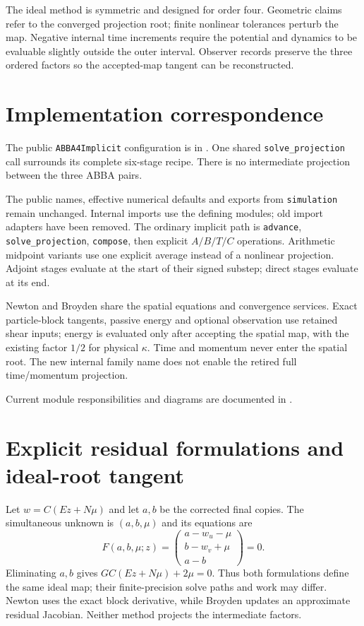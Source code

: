 \documentclass[11pt,a4paper]{article}
\begin{document}
The ideal method is symmetric and designed for order four.  Geometric claims
refer to the converged projection root; finite nonlinear tolerances perturb the
map.  Negative internal time increments require the potential and dynamics to
be evaluable slightly outside the outer interval.  Observer records preserve
the three ordered factors so the accepted-map tangent can be reconstructed.

\section{Implementation correspondence}
The public \texttt{ABBA4Implicit} configuration is in
. One shared
\texttt{solve\_projection} call surrounds its complete six-stage recipe.
There is no intermediate projection between the three ABBA pairs.

The public names, effective numerical defaults and exports from \texttt{simulation}
remain unchanged. Internal imports use the defining modules; old import
adapters have been removed. The ordinary implicit path is \texttt{advance}, \texttt{solve\_projection},
\texttt{compose}, then explicit $A/B/T/C$ operations.
Arithmetic midpoint variants use one explicit average instead of a nonlinear
projection. Adjoint stages evaluate at the start of their signed substep;
direct stages evaluate at its end.

Newton and Broyden share the spatial equations and convergence services.
Exact particle-block tangents, passive energy and optional observation use
retained shear inputs; energy is evaluated only after accepting the spatial
map, with the existing factor $1/2$ for physical $\kappa$. Time and momentum
never enter the spatial root. The new internal family name does not enable
the retired full time/momentum projection.

Current module responsibilities and diagrams are documented in
.

\section{Explicit residual formulations and ideal-root tangent}

Let $w=C(Ez+N\mu)$ and let $a,b$ be the corrected final copies. The
simultaneous unknown is $(a,b,\mu)$ and its equations are
\[
F(a,b,\mu;z)=
\begin{pmatrix}a-w_u-\mu\\b-w_v+\mu\\a-b\end{pmatrix}=0.
\]
Eliminating $a,b$ gives $G C(Ez+N\mu)+2\mu=0$. Thus both formulations define
the same ideal map; their finite-precision solve paths and work may differ.
Newton uses the exact block derivative, while Broyden updates an approximate
residual Jacobian. Neither method projects the intermediate factors.
\end{document}
